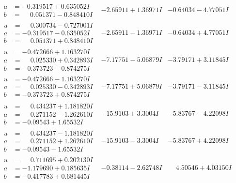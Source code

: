\documentclass[1p]{elsarticle_modified}
\theoremstyle{definition}
\begin{document}
$$\begin{array}{c|c|c}
\begin{aligned}
a &= -0.319517 + 0.635052 I \\
b &= \phantom{-}0.051371 - 0.848410 I\end{aligned}
 & -2.65911 + 1.36971 I & -0.64034 - 4.77051 I \\ \hline\begin{aligned}
u &= \phantom{-}0.300734 - 0.727001 I \\
a &= -0.319517 - 0.635052 I \\
b &= \phantom{-}0.051371 + 0.848410 I\end{aligned}
 & -2.65911 - 1.36971 I & -0.64034 + 4.77051 I \\ \hline\begin{aligned}
u &= -0.472666 + 1.163270 I \\
a &= \phantom{-}0.025330 + 0.342893 I \\
b &= -0.373723 - 0.874275 I\end{aligned}
 & -7.17751 - 5.06879 I & -3.79171 + 3.11845 I \\ \hline\begin{aligned}
u &= -0.472666 - 1.163270 I \\
a &= \phantom{-}0.025330 - 0.342893 I \\
b &= -0.373723 + 0.874275 I\end{aligned}
 & -7.17751 + 5.06879 I & -3.79171 - 3.11845 I \\ \hline\begin{aligned}
u &= \phantom{-}0.434237 + 1.181820 I \\
a &= \phantom{-}0.271152 - 1.262610 I \\
b &= -0.09543 + 1.65532 I\end{aligned}
 & -15.9103 + 3.3004 I & -5.83767 - 4.22098 I \\ \hline\begin{aligned}
u &= \phantom{-}0.434237 - 1.181820 I \\
a &= \phantom{-}0.271152 + 1.262610 I \\
b &= -0.09543 - 1.65532 I\end{aligned}
 & -15.9103 - 3.3004 I & -5.83767 + 4.22098 I \\ \hline\begin{aligned}
u &= \phantom{-}0.711695 + 0.202130 I \\
a &= -1.179690 + 0.185635 I \\
b &= -0.417783 + 0.681445 I\end{aligned}
 & -0.38114 - 2.62748 I & \phantom{-}4.50546 + 4.03150 I \\ \hline\begin{aligned}

\end{aligned}
\end{array}$$
\end{document}
